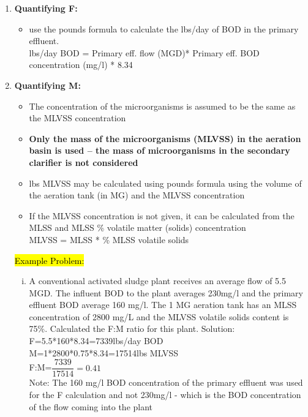 \begin{enumerate}
\item \textbf{Quantifying F:}
\begin{itemize}
\item use the pounds formula to calculate the lbs/day of BOD in the primary effluent.\\
lbs/day BOD = Primary eff. flow (MGD)* Primary eff. BOD concentration (mg/l) * 8.34\\
\end{itemize}
\item \textbf{Quantifying M:}
\begin{itemize}
\item The concentration of the microorganisms is assumed to be the same as the MLVSS concentration
\item \textbf{Only the mass of the microorganisms (MLVSS) in the aeration basin is used – the mass of microorganisms in the secondary clarifier is not considered} 
\item lbs MLVSS may be calculated using pounds formula using the volume of the aeration tank (in MG) and the MLVSS concentration
\item If the MLVSS concentration is not given, it can be calculated from the MLSS and MLSS \% volatile matter (solids) concentration\\
MLVSS = MLSS * \% MLSS volatile solids
\end{itemize}


\hl{Example Problem:}\\
\begin{enumerate}[i.]
\item A conventional activated sludge plant receives an average flow of 5.5 MGD. The influent BOD to the plant averages 230mg/l and the primary effluent BOD average 160 mg/l. The 1 MG aeration tank has an MLSS concentration of 2800 mg/L and the MLVSS volatile solids content is 75\%. Calculated the F:M ratio for this plant.
\vspace{0.3cm}
Solution:\\
\vspace{0.3cm}
F=5.5*160*8.34=7339lbs/day BOD\\
M=1*2800*0.75*8.34=17514lbs MLVSS\\
F:M=$\dfrac{7339}{17514}=\boxed{0.41}$\\

Note:  The 160 mg/l BOD concentration of the primary effluent was used for the F calculation and not 230mg/l - which is the BOD concentration of the flow coming into the plant\\
\end{enumerate}



\end{enumerate}
